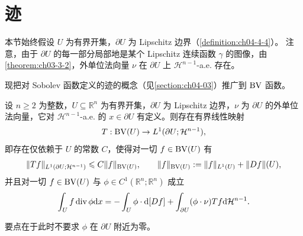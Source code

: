 \documentclass[../../main.tex]{subfiles}%
\begin{document}
\section{迹}\label{section:ch05-03}

本节始终假设 $U$ 为有界开集，$\partial U$ 为 Lipschitz 边界（\cref{definition:ch04-4-4}）。%
注意，由于 $\partial U$ 的每一部分局部地是某个 Lipschitz 连续函数 $\gamma$ 的图像，由\cref{theorem:ch03-3-2}，外单位法向量 $\nu$ 在 $\partial U$ 上 $\mathcal{H}^{n-1}$-a.e. 存在。%

现把对 Sobolev 函数定义的迹的概念（见\cref{section:ch04-03}）推广到 $\BV$ 函数。%

\begin{theorem}[$\BV$ 函数的迹]\label{theorem:ch05-5-6}
设 $n\geqslant2$ 为整数，$U\subseteq\mathbb{R}^n$ 为有界开集，$\partial U$ 为 Lipschitz 边界，$\nu$ 为 $\partial U$ 的外单位法向量，它对 $\mathcal{H}^{n-1}$-a.e. 的 $x\in\partial U$ 有定义。则存在有界线性映射
\begin{align*}
T:\mathrm{BV}(U)\to L^1(\partial U;\mathcal{H}^{n-1}),
\end{align*}
即存在仅依赖于 $U$ 的常数 $C$，使得对一切 $f\in\mathrm{BV}(U)$ 有
\begin{align*}
\lVert Tf\rVert_{L^1(\partial U;\mathcal{H}^{n-1})}\leqslant C\lVert f\rVert_{\mathrm{BV}(U)},\qquad \lVert f\rVert_{\mathrm{BV}(U)}:=\lVert f\rVert_{L^1(U)}+\lVert Df\rVert(U),
\end{align*}
并且对一切 $f\in\mathrm{BV}(U)$ 与 $\phi\in C^1(\mathbb{R}^n;\mathbb{R}^n)$ 成立
\begin{align}
\int_U f\operatorname{div}\phi\mathrm{d} x=-\int_U\phi\cdot\mathrm{d}[Df]+\int_{\partial U}(\phi\cdot\nu)Tf\mathrm{d}\mathcal{H}^{n-1}.\label{align:ch05-5-6-迹公式}
\end{align}
\end{theorem}

要点在于此时不要求 $\phi$ 在 $\partial U$ 附近为零。
\end{document}
